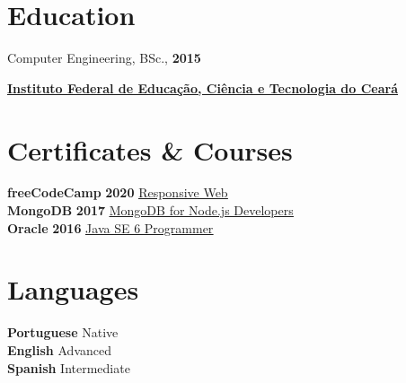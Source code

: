 \documentclass[10pt,a4paper]{article}
\begin{document}
\begin{minipage}[t]{0.3\textwidth}
\section*{Education}
Computer Engineering, BSc., \textbf{2015}
\begin{spacing}{1.25}
\bfseries \small
\href{https://ifce.edu.br/}{\uline{Instituto Federal de Educação, Ciência e Tecnologia do Ceará \faExternalLink}}
\end{spacing}
\end{minipage}
\hspace{0.5cm}
\begin{minipage}[t]{0.4\textwidth}
\section*{Certificates \& Courses}
{\color{head} \textbf{freeCodeCamp}} \textbf{2020} \href{https://www.freecodecamp.org/certification/joelxr/responsive-web-design}{\uline{Responsive Web \faExternalLink}} \\
{\color{head} \textbf{MongoDB}} \textbf{2017} \href{https://university.mongodb.com/course_completion/eb01dff6-609c-4eb3-bcfe-e8078451?utm_source=copy&utm_medium=social&utm_campaign=university_social_sharing}{\uline{MongoDB for Node.js Developers \faExternalLink}} \\
{\color{head} \textbf{Oracle}} \textbf{2016} \href{https://www.dropbox.com/s/l8mek0rc72unfwc/Certificado_OCJP.pdf?dl=0}{\uline{Java SE 6 Programmer \faExternalLink}} \\
\end{minipage}
\hspace{0.5cm}
\begin{minipage}[t]{0.2\textwidth}
\section*{Languages}
{\color{head} \textbf{Portuguese}} Native \\
{\color{head} \textbf{English}} Advanced \\
{\color{head} \textbf{Spanish}} Intermediate
\end{minipage}
\end{document}
